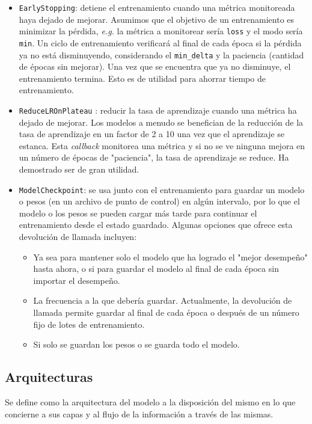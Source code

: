 \documentclass[a4paper,12pt]{article}
\begin{document}
\begin{itemize}
	\item \texttt{EarlyStopping}: detiene el entrenamiento cuando una métrica monitoreada haya dejado de mejorar. Asumimos que el objetivo de un entrenamiento es minimizar la pérdida, \textit{e.g.} la métrica a monitorear sería \texttt{loss} y el modo sería \texttt{min}. Un ciclo de entrenamiento verificará al final de cada época si la pérdida ya no está disminuyendo, considerando el \texttt{min\_delta} y la paciencia (cantidad de épocas sin mejorar). Una vez que se encuentra que ya no disminuye, el entrenamiento termina. Esto es de utilidad para ahorrar tiempo de entrenamiento.
	\item \texttt{ReduceLROnPlateau} \label{plateau}: reducir la tasa de aprendizaje cuando una métrica ha dejado de mejorar. Los modelos a menudo se benefician de la reducción de la tasa de aprendizaje en un factor de 2 a 10 una vez que el aprendizaje se estanca. Esta \textit{callback} monitorea una métrica y si no se ve ninguna mejora en un número de épocas de "paciencia", la tasa de aprendizaje se reduce. Ha demostrado ser de gran utilidad.
	\item \texttt{ModelCheckpoint}: se usa junto con el entrenamiento para guardar un modelo o pesos (en un archivo de punto de control) en algún intervalo, por lo que el modelo o los pesos se pueden cargar más tarde para continuar el entrenamiento desde el estado guardado.
	Algunas opciones que ofrece esta devolución de llamada incluyen:
	\begin{itemize}
		\item Ya sea para mantener solo el modelo que ha logrado el "mejor desempeño" hasta ahora, o si para guardar el modelo al final de cada época sin importar el desempeño.
		\item La frecuencia a la que debería guardar. Actualmente, la devolución de llamada permite guardar al final de cada época o después de un número fijo de lotes de entrenamiento.
		\item Si solo se guardan los pesos o se guarda todo el modelo.
	\end{itemize}
\end{itemize}

\subsection{Arquitecturas} \label{archs}
Se define como la arquitectura del modelo a la disposición del mismo en lo que concierne a sus capas y al flujo de la información a través de las mismas.
\end{document}
